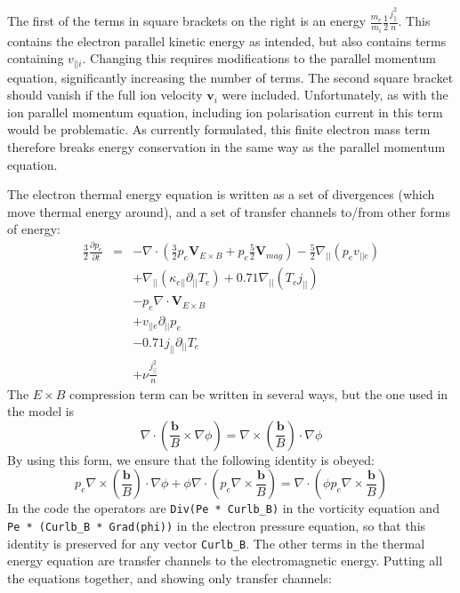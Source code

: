 \documentclass[12pt,a4paper]{article}
\newcommand{\deriv}[2]{\frac{\partial #1}{\partial #2}}
\begin{document}
The first of the terms in square brackets on the right is an energy $\frac{m_e}{m_i}\frac{1}{2}\frac{j_{||}^2}{n}$. This contains the electron
parallel kinetic energy as intended, but also contains terms containing $v_{||i}$. Changing this requires modifications to the parallel momentum
equation, significantly increasing the number of terms. The second square bracket should vanish if the full ion velocity $\mathbf{v}_i$ were included.
Unfortunately, as with the ion parallel momentum equation, including ion polarisation current in this term would be problematic. 
As currently formulated, this finite electron mass term therefore breaks energy conservation in the same way as the parallel momentum equation. 


The electron thermal energy equation is written as a set of divergences (which move thermal energy around), and a
set of transfer channels to/from other forms of energy:
\begin{eqnarray*}
  \frac{3}{2}\deriv{p_e}{t} &=& -\nabla\cdot\left(\frac{3}{2}p_e\mathbf{V}_{E\times B} + p_e\frac{5}{2}\mathbf{V}_{mag}\right) - \frac{5}{2}\nabla_{||}\left(p_e v_{||e}\right) \\
  && + \nabla_{||}\left(\kappa_{e||}\partial_{||}T_e\right) + 0.71\nabla_{||}\left(T_e j_{||}\right) \\
  && - p_e\nabla\cdot\mathbf{V}_{E\times B} \\
  &&  + v_{||e}\partial_{||}p_e \\
  &&  - 0.71 j_{||}\partial_{||} T_e \\
  &&  + \nu\frac{j_{||}^2}{n}
\end{eqnarray*}
The $E\times B$ compression term can be written in several ways, but the one used in the model is
\[
\nabla\cdot\left(\frac{\mathbf{b}}{B} \times \nabla\phi\right) = \nabla\times\left(\frac{\mathbf{b}}{B}\right)\cdot\nabla\phi 
\]
By using this form, we ensure that the following identity is obeyed:
\[
p_e\nabla\times\left(\frac{\mathbf{b}}{B}\right)\cdot\nabla\phi + \phi\nabla\cdot\left(p_e\nabla\times\frac{\mathbf{b}}{B}\right) = \nabla\cdot\left(\phi p_e\nabla\times\frac{\mathbf{b}}{B}\right)
\]
In the code the operators are \texttt{Div(Pe * Curlb\_B)} in the vorticity equation and \texttt{Pe * (Curlb\_B * Grad(phi))} in the electron pressure equation, so that this identity is preserved for any vector \texttt{Curlb\_B}. The other terms in the thermal energy equation are transfer channels to the electromagnetic energy. Putting all the equations together, and showing only transfer channels:
\end{document}
